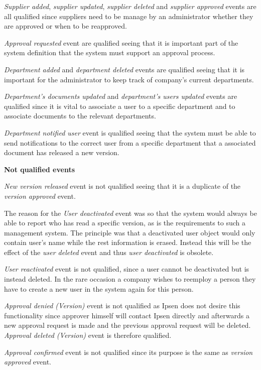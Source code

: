 \textit{Supplier added}, \textit{supplier updated},  \textit{supplier deleted} and \textit{supplier approved} events are all qualified since suppliers need to be manage by an administrator whether they are approved or when to be reapproved.

\textit{Approval requested} event are qualified seeing that it is important part of the system definition that the system must support an approval process.

\textit{Department added} and \textit{department deleted} events are qualified seeing that it is important for the administrator to keep track of company's current departments.

\textit{Department's documents updated} and \textit{department's users updated} events are qualified since it is vital to associate a user to a specific department and to associate documents to the relevant departments.

\textit{Department notified user} event is qualified seeing that the system must be able to send notifications to the correct user from a specific department that a associated document has released a new version.

\textbf{Not qualified events}

\textit{New version released} event is not qualified seeing that it is a duplicate of the \textit{version approved} event.

The reason for the \textit{User deactivated} event was so that the system would always be able to report who has read a specific version, as is the requirements to such a management system. The principle was that a deactivated user object would only contain user's name while the rest information is erased. Instead this will be the effect of the \textit{user deleted} event and thus \textit{user deactivated} is obsolete.

\textit{User reactivated} event is not qualified, since a user cannot be deactivated but is instead deleted. In the rare occasion a company wishes to reemploy a person they have to create a new user in the system again for this person.

\textit{Approval denied (Version)} event is not qualified as Ipsen does not desire this functionality since approver himself will contact Ipsen directly and afterwards a new approval request is made and the previous approval request will be deleted. \textit{Approval deleted (Version)} event is therefore qualified.

\textit{Approval confirmed} event is not qualified since its purpose is the same as \textit{version approved} event.

